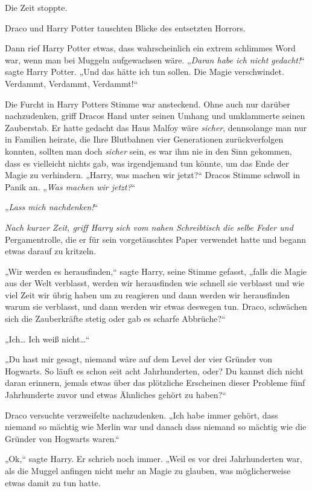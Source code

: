 {Die Zeit stoppte.

Draco und Harry Potter tauschten Blicke des entsetzten Horrors.

Dann rief Harry Potter etwas, dass wahrscheinlich ein extrem schlimmes Word war, wenn man bei Muggeln aufgewachsen wäre. „\emph{Daran habe ich nicht gedacht!}“ sagte Harry Potter. „Und das hätte ich tun sollen. Die Magie verschwindet. Verdammt, Verdammt, Verdammt!“

Die Furcht in Harry Potters Stimme war ansteckend. Ohne auch nur darüber nachzudenken, griff Dracos Hand unter seinen Umhang und umklammerte seinen Zauberstab. Er hatte gedacht das Haus Malfoy wäre \emph{sicher}, dennsolange man nur in Familien heirate, die Ihre Blutbahnen vier Generationen zurückverfolgen konnten, sollten man doch \emph{sicher} sein, es war ihm nie in den Sinn gekommen, dass es vielleicht nichts gab, was irgendjemand tun könnte, um das Ende der Magie zu verhindern. „Harry, was machen wir jetzt?“ Dracos Stimme schwoll in Panik an. „\emph{Was machen wir jetzt?}“

„\emph{Lass mich nachdenken!}“

\emph{Nach kurzer Zeit, griff Harry sich vom nahen Schreibtisch die selbe Feder und} Pergamentrolle, die er für sein vorgetäuschtes Paper verwendet hatte und begann etwas darauf zu kritzeln.

„Wir werden es herausfinden,“ sagte Harry, seine Stimme gefasst, „falls die Magie aus der Welt verblasst, werden wir herausfinden wie schnell sie verblasst und wie viel Zeit wir übrig haben um zu reagieren und dann werden wir herausfinden warum sie verblasst, und dann werden wir etwas deswegen tun. Draco, schwächen sich die Zauberkräfte stetig oder gab es scharfe Abbrüche?“

„Ich… Ich weiß nicht…“

„Du hast mir gesagt, niemand wäre auf dem Level der vier Gründer von Hogwarts. So läuft es schon seit acht Jahrhunderten, oder? Du kannst dich nicht daran erinnern, jemals etwas über das plötzliche Erscheinen dieser Probleme fünf Jahrhunderte zuvor und etwas Ähnliches gehört zu haben?“

Draco versuchte verzweifelte nachzudenken. „Ich habe immer gehört, dass niemand so mächtig wie Merlin war und danach dass niemand so mächtig wie die Gründer von Hogwarts waren.“

„Ok,“ sagte Harry. Er schrieb noch immer. „Weil es vor drei Jahrhunderten war, als die Muggel anfingen nicht mehr an Magie zu glauben, was möglicherweise etwas damit zu tun hatte.

}
